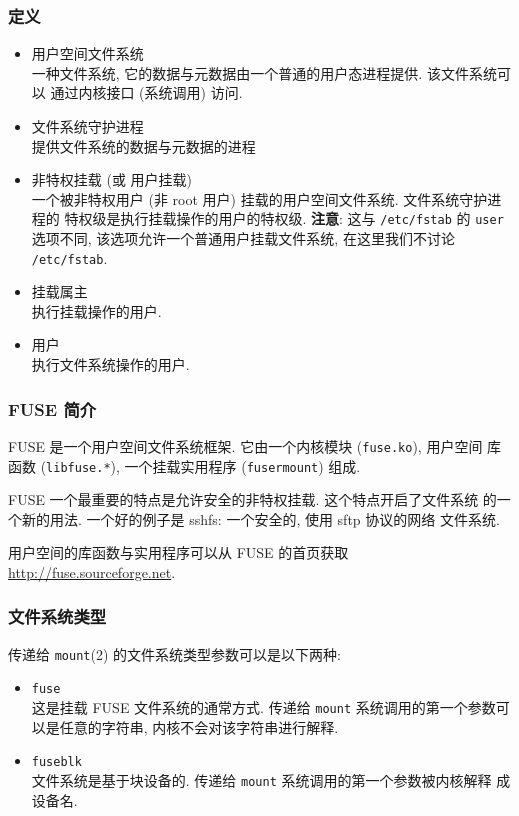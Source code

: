 \documentclass[nofonts, titlepage]{ctexart}
\begin{document}
\subsubsection{定义}\label{ux5b9aux4e49}

\begin{itemize}
\item
  用户空间文件系统\\一种文件系统,
  它的数据与元数据由一个普通的用户态进程提供. 该文件系统可以
  通过内核接口 (系统调用) 访问.
\item
  文件系统守护进程\\提供文件系统的数据与元数据的进程
\item
  非特权挂载 (或 用户挂载)\\一个被非特权用户 (非 root 用户)
  挂载的用户空间文件系统. 文件系统守护进程的
  特权级是执行挂载操作的用户的特权级. \textbf{注意}: 这与
  \texttt{/etc/fstab} 的 \texttt{user} 选项不同,
  该选项允许一个普通用户挂载文件系统, 在这里我们不讨论
  \texttt{/etc/fstab}.
\item
  挂载属主\\执行挂载操作的用户.
\item
  用户\\执行文件系统操作的用户.
\end{itemize}

\subsubsection{FUSE 简介}\label{ux4ec0ux4e48ux662f-fuse}

FUSE 是一个用户空间文件系统框架. 它由一个内核模块 (\texttt{fuse.ko}),
用户空间 库函数 (\texttt{libfuse.*}), 一个挂载实用程序
(\texttt{fusermount}) 组成.

FUSE 一个最重要的特点是允许安全的非特权挂载. 这个特点开启了文件系统
的一个新的用法. 一个好的例子是 sshfs: 一个安全的, 使用 sftp 协议的网络
文件系统.

用户空间的库函数与实用程序可以从 FUSE 的首页获取
\url{http://fuse.sourceforge.net}.

\subsubsection{文件系统类型}\label{ux6587ux4ef6ux7cfbux7edfux7c7bux578b}

传递给 \texttt{mount}(2) 的文件系统类型参数可以是以下两种:
\begin{itemize}
    \item
\texttt{fuse}\\这是挂载 FUSE 文件系统的通常方式. 传递给 \texttt{mount}
系统调用的第一个参数可 以是任意的字符串, 内核不会对该字符串进行解释.
\item 
\texttt{fuseblk}\\文件系统是基于块设备的. 传递给 \texttt{mount}
系统调用的第一个参数被内核解释 成设备名.
\end{itemize}
\end{document}
